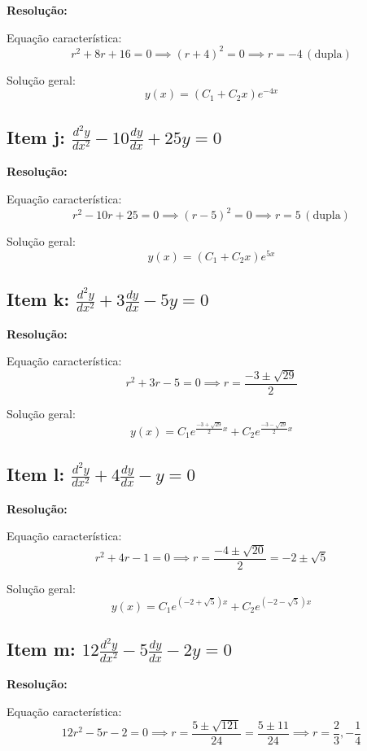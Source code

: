 \documentclass[12pt,a4paper]{article}
\begin{document}
\textbf{Resolução:}

Equação característica:
\[
r^2 + 8r + 16 = 0 \implies (r+4)^2 = 0 \implies r = -4 \, (\text{dupla})
\]

Solução geral:
\[
\boxed{y(x) = (C_1 + C_2 x)e^{-4x}}
\]

\subsection*{Item j: \(\frac{d^2 y}{dx^2} - 10 \frac{dy}{dx} + 25y = 0\)}

\textbf{Resolução:}

Equação característica:
\[
r^2 - 10r + 25 = 0 \implies (r-5)^2 = 0 \implies r = 5 \, (\text{dupla})
\]

Solução geral:
\[
\boxed{y(x) = (C_1 + C_2 x)e^{5x}}
\]

\subsection*{Item k: \(\frac{d^2 y}{dx^2} + 3 \frac{dy}{dx} - 5y = 0\)}

\textbf{Resolução:}

Equação característica:
\[
r^2 + 3r - 5 = 0 \implies r = \frac{-3 \pm \sqrt{29}}{2}
\]

Solução geral:
\[
\boxed{y(x) = C_1 e^{\frac{-3 + \sqrt{29}}{2}x} + C_2 e^{\frac{-3 - \sqrt{29}}{2}x}}
\]

\subsection*{Item l: \(\frac{d^2 y}{dx^2} + 4 \frac{dy}{dx} - y = 0\)}

\textbf{Resolução:}

Equação característica:
\[
r^2 + 4r - 1 = 0 \implies r = \frac{-4 \pm \sqrt{20}}{2} = -2 \pm \sqrt{5}
\]

Solução geral:
\[
\boxed{y(x) = C_1 e^{(-2 + \sqrt{5})x} + C_2 e^{(-2 - \sqrt{5})x}}
\]

\subsection*{Item m: \(12 \frac{d^2 y}{dx^2} - 5 \frac{dy}{dx} - 2y = 0\)}

\textbf{Resolução:}

Equação característica:
\[
12r^2 - 5r - 2 = 0 \implies r = \frac{5 \pm \sqrt{121}}{24} = \frac{5 \pm 11}{24} \implies r = \frac{2}{3}, -\frac{1}{4}
\]
\end{document}
